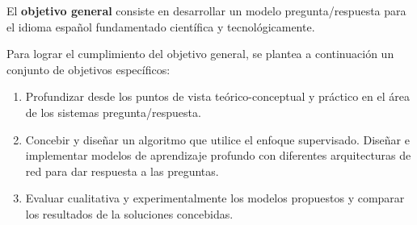 El \textbf{objetivo general} consiste en desarrollar un modelo pregunta/respuesta para el idioma español fundamentado científica y tecnológicamente.

Para lograr el cumplimiento del objetivo general, se plantea a continuación un conjunto de objetivos específicos:

\begin{enumerate}
    \item Profundizar desde los puntos de vista teórico-conceptual y práctico en el área de los sistemas pregunta/respuesta. 
    \item Concebir y diseñar un algoritmo que utilice el enfoque supervisado. Diseñar e implementar modelos de aprendizaje profundo con diferentes arquitecturas de red para dar respuesta a las preguntas.
    \item Evaluar cualitativa y experimentalmente los modelos propuestos y comparar los resultados de la soluciones concebidas.
\end{enumerate}

